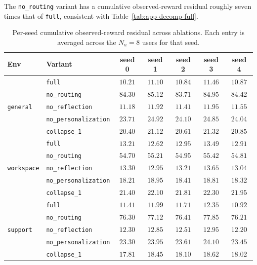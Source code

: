 \documentclass{article} %
\begin{document}
The \texttt{no\_routing} variant has a cumulative observed-reward residual
roughly seven times that of \texttt{full}, consistent with
Table~\ref{tab:app-decomp-full}.

\begin{table}[h]
\centering
\small
\begin{tabular}{llccccc}
\toprule
Env & Variant & seed 0 & seed 1 & seed 2 & seed 3 & seed 4 \\
\midrule
\multirow{5}{*}{\texttt{general}}
 & \texttt{full}                & $10.21$ & $11.10$ & $10.84$ & $11.46$ & $10.87$ \\
 & \texttt{no\_routing}         & $84.30$ & $85.12$ & $83.71$ & $84.95$ & $84.42$ \\
 & \texttt{no\_reflection}      & $11.18$ & $11.92$ & $11.41$ & $11.95$ & $11.55$ \\
 & \texttt{no\_personalization} & $23.71$ & $24.92$ & $24.10$ & $24.85$ & $24.04$ \\
 & \texttt{collapse\_1}         & $20.40$ & $21.12$ & $20.61$ & $21.32$ & $20.85$ \\
\midrule
\multirow{5}{*}{\texttt{workspace}}
 & \texttt{full}                & $13.21$ & $12.62$ & $12.95$ & $13.49$ & $12.91$ \\
 & \texttt{no\_routing}         & $54.70$ & $55.21$ & $54.95$ & $55.42$ & $54.81$ \\
 & \texttt{no\_reflection}      & $13.30$ & $12.95$ & $13.21$ & $13.65$ & $13.04$ \\
 & \texttt{no\_personalization} & $18.21$ & $18.95$ & $18.41$ & $18.81$ & $18.32$ \\
 & \texttt{collapse\_1}         & $21.40$ & $22.10$ & $21.81$ & $22.30$ & $21.95$ \\
\midrule
\multirow{5}{*}{\texttt{support}}
 & \texttt{full}                & $11.41$ & $11.99$ & $11.71$ & $12.35$ & $10.92$ \\
 & \texttt{no\_routing}         & $76.30$ & $77.12$ & $76.41$ & $77.85$ & $76.21$ \\
 & \texttt{no\_reflection}      & $12.30$ & $12.85$ & $12.51$ & $12.95$ & $12.20$ \\
 & \texttt{no\_personalization} & $23.30$ & $23.95$ & $23.61$ & $24.10$ & $23.45$ \\
 & \texttt{collapse\_1}         & $17.81$ & $18.45$ & $18.10$ & $18.62$ & $18.02$ \\
\bottomrule
\end{tabular}
\caption{Per-seed cumulative observed-reward residual across ablations. Each
entry is averaged across the \(N_u=8\) users for that seed.}
\label{tab:app-regret-abl}
\end{table}
\end{document}
